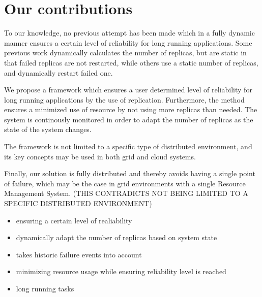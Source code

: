 \documentclass{cslthse-msc}
\begin{document}
\section{Our contributions}
To our knowledge, no previous attempt has been made which in a fully dynamic manner ensures a certain level of reliability for long running applications. Some previous work dynamically calculates the number of replicas, but are static in that failed replicas are not restarted, while others use a static number of replicas, and dynamically restart failed one.

We propose a framework which ensures a user determined level of reliability for long running applications by the use of replication. Furthermore, the method ensures a minimized use of resource by not using more replicas than needed. The system is continously monitored in order to adapt the number of replicas as the state of the system changes.

The framework is not limited to a specific type of distributed environment, and its key concepts may be used in both grid and cloud systems.

Finally, our solution is fully distributed and thereby avoids having a single point of failure, which may be the case in grid environments with a single Resource Management System. (THIS CONTRADICTS NOT BEING LIMITED TO A SPECIFIC DISTRIBUTED ENVIRONMENT)


\iffalse
\begin{itemize}
\item ensuring a certain level of realiability
\item dynamically adapt the number of replicas based on system state
\item takes historic failure events into account
\item minimizing resource usage while ensuring reliability level is reached
\item long running tasks
\end{itemize}
\end{document}
